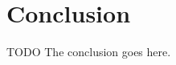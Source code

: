 \documentclass[journal]{IEEEtran}
\begin{document}
%





\section{Conclusion}
\label{sec:conclusion}
TODO The conclusion goes here.






%
\end{document}

